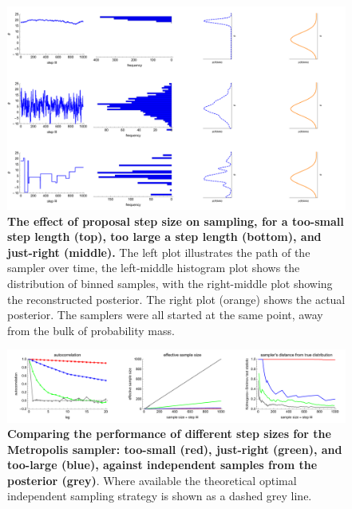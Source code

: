 \documentclass[11pt,fullpage]{book}
\begin{document}
\begin{figure}
\centerline{\includegraphics[width=1.5\textwidth]{metropolisHastings_rateOfConvergence.pdf}}
\caption{\textbf{The effect of proposal step size on sampling, for a too-small step length (top), too large a step length (bottom), and just-right (middle).} The left plot illustrates the path of the sampler over time, the left-middle histogram plot shows the distribution of binned samples, with the right-middle plot showing the reconstructed posterior. The right plot (orange) shows the actual posterior. The samplers were all started at the same point, away from the bulk of probability mass.}\label{fig:metropolisHastings_rateOfConvergence}
\end{figure}

\begin{figure}
\centerline{\includegraphics[width=1.3\textwidth]{metropolisHastings_rateOfConvergence1.pdf}}
\caption{\textbf{Comparing the performance of different step sizes for the Metropolis sampler: too-small (red), just-right (green), and too-large (blue), against independent samples from the posterior (grey)}. Where available the theoretical optimal independent sampling strategy is shown as a dashed grey line.}\label{fig:metropolisHastings_rateOfConvergence1}
\end{figure}
\end{document}
